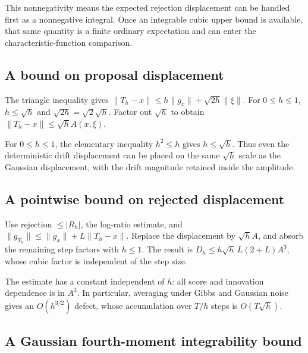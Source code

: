 \documentclass[11pt,a4paper]{report}
\begin{document}
This nonnegativity means the expected rejection displacement can be handled first as a nonnegative integral. Once an integrable cubic upper bound is available, that same quantity is a finite ordinary expectation and can enter the characteristic-function comparison.

\subsection{\texorpdfstring{A bound on proposal displacement}{A bound on proposal displacement}}
\label{report-step-UnadjustedLangevin-MALAError-lean-13}


The triangle inequality gives \(\|T_h-x\|\le h\|g_x\|+\sqrt{2h}\|\xi\|\). For \(0\le h\le1\), \(h\le\sqrt h\) and \(\sqrt{2h}=\sqrt2\sqrt h\). Factor out \(\sqrt h\) to obtain \(\|T_h-x\|\le\sqrt h A(x,\xi)\).



For \(0\le h\le1\), the elementary inequality \(h^2\le h\) gives \(h\le\sqrt h\). Thus even the deterministic drift displacement can be placed on the same \(\sqrt h\) scale as the Gaussian displacement, with the drift magnitude retained inside the amplitude.

\subsection{\texorpdfstring{A pointwise bound on rejected displacement}{A pointwise bound on rejected displacement}}
\label{report-step-UnadjustedLangevin-MALAError-lean-14}


Use rejection \(\le|R_h|\), the log-ratio estimate, and \(\|g_{T_h}\|\le\|g_x\|+L\|T_h-x\|\). Replace the displacement by \(\sqrt hA\), and absorb the remaining step factors with \(h\le1\). The result is \(D_h\le h\sqrt h\,L(2+L)A^3\), whose cubic factor is independent of the step size.



The estimate has a constant independent of \(h\): all score and innovation dependence is in \(A^3\). In particular, averaging under Gibbs and Gaussian noise gives an \(O(h^{3/2})\) defect, whose accumulation over \(T/h\) steps is \(O(T\sqrt h)\).

\subsection{\texorpdfstring{A Gaussian fourth-moment integrability bound}{A Gaussian fourth-moment integrability bound}}
\label{report-step-UnadjustedLangevin-MALAError-lean-15}
\end{document}
